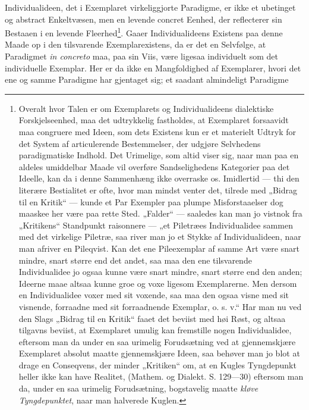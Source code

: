 \documentclass[12pt,a4paper]{book}
\begin{document}
Individualideen, det i Exemplaret virkeliggjorte Paradigme, er ikke et ubetinget
og abstract Enkeltvæsen, men en levende concret Eenhed, der reflecterer sin
Bestaaen i en levende Fleerhed\footnote{Overalt hvor Talen er om Exemplarets og
Individualideens dialektiske Forskjelseenhed, maa det udtrykkelig fastholdes, at
Exemplaret forsaavidt maa congruere med Ideen, som dets Existens kun er et
materielt Udtryk for det System af articulerende Bestemmelser, der udgjøre
Selvhedens paradigmatiske Indhold. Det Urimelige, som altid viser sig, naar man
paa en aldeles umiddelbar Maade vil overføre Sandselighedens Kategorier paa det
Ideelle, kan da i denne Sammenhæng ikke overraske os. Imidlertid --- thi den
literære Bestialitet er ofte, hvor man mindst venter det, tilrede med „Bidrag
til en Kritik“ --- kunde et Par Exempler paa plumpe Misforstaaelser dog maaskee
her være paa rette Sted. „Falder“ --- saaledes kan man jo vistnok fra
„Kritikens“ Standpunkt raisonnere --- „et Piletræes Individualidee sammen med
det virkelige Piletræ, saa river man jo et Stykke af Individualideen, naar man
afriver en Pileqvist. Kan det ene Pileexemplar af samme Art være snart mindre,
snart større end det andet, saa maa den ene tilsvarende Individualidee jo ogsaa
kunne være snart mindre, snart større end den anden; Ideerne maae altsaa kunne
groe og voxe ligesom Exemplarerne. Men dersom en Individualidee voxer med sit
voxende, saa maa den ogsaa visne med sit visnende, forraadne med sit
forraadnende Exemplar, o. s. v.“ Har man nu ved den Slags „Bidrag til en Kritik“
faaet det beviist med høi Røst, og altsaa tilgavns beviist, at Exemplaret umulig
kan fremstille nogen Individualidee, eftersom man da under en saa urimelig
Forudsætning ved at gjennemskjære Exemplaret absolut maatte gjennemskjære Ideen,
saa behøver man jo blot at drage en Conseqvens, der minder „Kritiken“ om, at en
Kugles Tyngdepunkt heller ikke kan have Realitet, (Mathem. og Dialekt.
S. 129---30) eftersom man da, under en saa urimelig Forudsætning, bogstavelig
maatte \emph{kløve Tyngdepunktet}, naar man halverede Kuglen.}. Gaaer
Individualideens Existens paa
denne Maade op i den tilsvarende Exemplarexistens, da er det en Selvfølge, at
Paradigmet \textit{in concreto} maa, paa sin Viis, være ligesaa individuelt som
det individuelle Exemplar. Her er da ikke en Mangfoldighed af Exemplarer, hvori
det ene og samme Paradigme har gjentaget sig; et saadant almindeligt Paradigme
\end{document}
